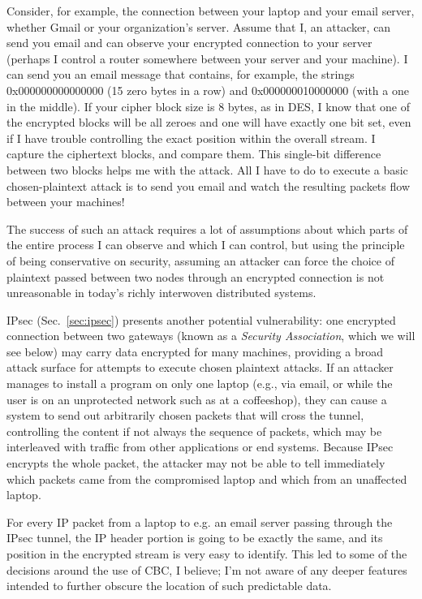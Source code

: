 Consider, for example, the connection between your laptop and your
email server, whether Gmail or your organization's server.  Assume
that I, an attacker, can send you email and can observe your encrypted
connection to your server (perhaps I control a router somewhere
between your server and your machine).  I can send you an email
message that contains, for example, the strings 0x000000000000000 (15
zero bytes in a row) and 0x000000010000000 (with a one in the middle).
If your cipher block size is 8 bytes, as in DES, I know that one of
the encrypted blocks will be all zeroes and one will have exactly one
bit set, even if I have trouble controlling the exact position within
the overall stream.  I capture the ciphertext blocks, and compare
them.  This single-bit difference between two blocks helps me with the
attack.  All I have to do to execute a basic chosen-plaintext attack
is to send you email and watch the resulting packets flow between your
machines!

The success of such an attack requires a lot of assumptions about
which parts of the entire process I can observe and which I can
control, but using the principle of being conservative on security,
assuming an attacker can force the choice of plaintext passed between
two nodes through an encrypted connection is not unreasonable in
today's richly interwoven distributed systems.

IPsec (Sec.~\ref{sec:ipsec}) presents another potential vulnerability:
one encrypted connection between two gateways (known as a
\emph{Security Association}, which we will see below) may carry data
encrypted for many machines, providing a broad attack surface for
attempts to execute chosen plaintext attacks.  If an attacker manages
to install a program on only one laptop (e.g., via email, or while the
user is on an unprotected network such as at a coffeeshop), they can
cause a system to send out arbitrarily chosen packets that will cross
the tunnel, controlling the content if not always the sequence of
packets, which may be interleaved with traffic from other applications
or end systems.  Because IPsec encrypts the whole packet, the attacker
may not be able to tell immediately which packets came from the
compromised laptop and which from an unaffected laptop.

For every IP packet from a laptop to e.g. an email server passing
through the IPsec tunnel, the IP header portion is going to be exactly
the same, and its position in the encrypted stream is very easy to
identify.  This led to some of the decisions around the use of CBC, I
believe; I'm not aware of any deeper features intended to further
obscure the location of such predictable data.  \ddp{}

